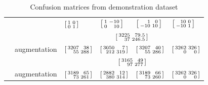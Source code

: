 \documentclass[\ifafour a4paper,12pt,\else a5paper,10pt,\fi%
onecolumn,oneside,article,%
british%
]{memoir}
\theoremstyle{remark}
\theoremstyle{innote}
\renewcommand*{\|}[1][]{\nonscript\:#1\vert\nonscript\:\mathopen{}}
\newcommand*{\sumatrix}[4]{\begin{bsmallmatrix*}[r]#1&#2\\#3&#4\end{bsmallmatrix*}}
\begin{document}
%
\begin{table}[!p]
  \centering
  \small
  \begin{tabular*}{\linewidth}{clw{c}{0.12\linewidth}w{c}{0.12\linewidth}w{c}{0.12\linewidth}w{c}{0.12\linewidth}}
&    &$\sumatrix{1}{0}{0}{1}$
 &$\sumatrix{1}{-10}{0}{10}$
 &$\sumatrix{1}{0}{-10}{10}$
 &$\sumatrix{10}{0}{-10}{1}$
    \\[4\jot]
 &\parbox{0.21\linewidth}{\color{myred}}
 &\multicolumn{4}{c}{\textcolor{myred}{$\sumatrix{3225}{79.5}{37}{246.5}$}}
 \\[2\jot]
 &\parbox{0.21\linewidth}{\color{mypurpleblue}augmentation}
 &\textcolor{mypurpleblue}{$\sumatrix{3207}{38}{55}{288}$}
 &\textcolor{mypurpleblue}{$\sumatrix{3050}{7}{212}{319}$}
 &\textcolor{mypurpleblue}{$\sumatrix{3207}{40}{55}{286}$}
 &\textcolor{mypurpleblue}{$\sumatrix{3262}{326}{0}{0}$}
 \\[6\jot]
 &\parbox{0.21\linewidth}{\color{myred}}
 &\multicolumn{4}{c}{\textcolor{myred}{$\sumatrix{3165}{49}{97}{277}$}}
 \\[2\jot]
 &\parbox{0.21\linewidth}{\color{mypurpleblue} augmentation}
 &\textcolor{mypurpleblue}{$\sumatrix{3189}{65}{73}{261}$}
 &\textcolor{mypurpleblue}{$\sumatrix{2882}{12}{380}{314}$}
 &\textcolor{mypurpleblue}{$\sumatrix{3189}{66}{73}{260}$}
 &\textcolor{mypurpleblue}{$\sumatrix{3262}{326}{0}{0}$}
 \end{tabular*}
  \\[1em]
  \caption{Confusion matrices from demonstration dataset}
  \label{tab:results_CM}

\vspace{6em}
  

\end{table}
\end{document}
